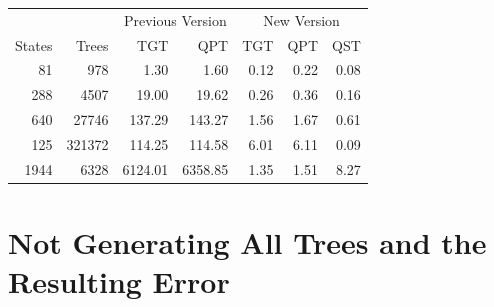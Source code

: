 \documentclass[12pt]{article}
\begin{document}
\begin{table}
	\centering
    \begin{tabular}{|r|r||r|r||r|r|r|}
\hline
& & \multicolumn{2}{c||}{Previous Version}
& \multicolumn{3}{c|}{New Version}
\\
\cline{3-7}
	    States & Trees  & TGT & QPT
& TGT & QPT    & QST    \\
\hline
	    81     & 978
& 1.30 	  & 1.60
& 0.12 	& 0.22  & 0.08
\\ \hline
	    288    & 4507
& 19.00   & 19.62
& 0.26	& 0.36  & 0.16
\\ \hline
	    640    & 27746
& 137.29  & 143.27
& 1.56	& 1.67  & 0.61
\\ \hline
	    125    & 321372
& 114.25  & 114.58
& 6.01	& 6.11  & 0.09
\\ \hline
	    1944   & 6328
& 6124.01 & 6358.85
& 1.35	& 1.51  & 8.27
\\ \hline
	\end{tabular}
	\label{tab:times}
\end{table}








\section{Not Generating All Trees and
the Resulting Error}
\label{sec:approx}
\end{document}
